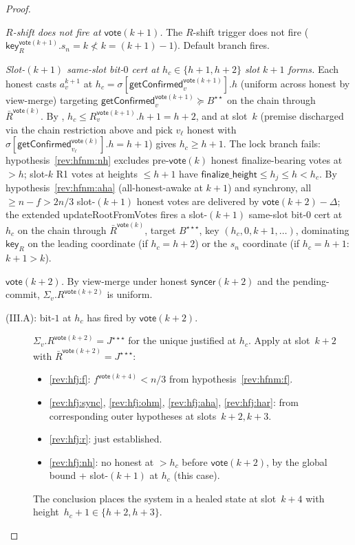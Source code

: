 \documentclass{article}
\newcommand{\finalizeHeight}{\mathsf{finalize\_height}}
\newcommand{\key}{\mathsf{key}}
\newcommand{\syncer}{\mathsf{syncer}}
\newcommand{\vote}{\mathsf{vote}}
\newcommand{\comm}[1]{\bar{#1}}
\newcommand{\updateRootFromVotes}{\textsf{updateRootFromVotes}\xspace}
\newcommand{\getConfirmed}{\textsf{getConfirmed}\xspace}
\theoremstyle{plain}
\theoremstyle{definition}
\theoremstyle{remark}
\newcommand{\AHA}{all-honest-awake\xspace}
\begin{document}
\begin{proof}
\begin{description}
\emph{$R$-shift does not fire at $\vote(k+1)$.}
The $R$-shift trigger does not fire ($\key_R^{\vote(k+1)}.s_n = k \not< k = (k+1) - 1$). Default branch fires.

\emph{Slot-$(k+1)$ same-slot bit-$0$ cert at $h_c \in \{h+1, h+2\}$ slot $k+1$ forms.}
Each honest casts $a^{k+1}_v$ at $h_c = \sigma[\getConfirmed_v^{\vote(k+1)}].h$ (uniform across honest by view-merge) targeting $\getConfirmed_v^{\vote(k+1)} \succeq B^{\star\star}$ on the chain through $\comm{R}^{\vote(k)}$. By , $h_c \leq R_v^{\vote(k+1)}.h + 1 = h+2$, and  at slot~$k$ (premise discharged via the chain restriction above and pick $v_\ell$ honest with $\sigma[\getConfirmed_{v_\ell}^{\vote(k)}].h = h+1$) gives $h_c \geq h+1$. The lock branch fails: hypothesis~\ref{rev:hfnm:nh} excludes pre-$\vote(k)$ honest finalize-bearing votes at $> h$; slot-$k$ R1 votes at heights $\leq h+1$ have $\finalizeHeight \leq h_j \leq h < h_c$. By hypothesis~\ref{rev:hfnm:aha} (\AHA at $k+1$) and synchrony, all $\geq n - f > 2n/3$ slot-$(k+1)$ honest votes are delivered by $\vote(k+2) - \Delta$; the extended \updateRootFromVotes{} fires a slot-$(k+1)$ same-slot bit-$0$ cert at $h_c$ on the chain through $\comm{R}^{\vote(k)}$, target $B^{\star\star\star}$, key $(h_c, 0, k+1, \ldots)$, dominating $\key_R$ on the leading coordinate (if $h_c = h+2$) or the $s_n$ coordinate (if $h_c = h+1$: $k+1 > k$).

\emph{$\vote(k+2)$.}
By view-merge under honest $\syncer(k+2)$ and the pending-commit, $\Sigma_v.R^{\vote(k+2)}$ is uniform.

\begin{description}
\item[{(III.A): bit-$1$ at $h_c$ has fired by $\vote(k+2)$.}]\hfill

$\Sigma_v.R^{\vote(k+2)} = J^{\star\star\star}$ for the unique justified at $h_c$. Apply  at slot~$k+2$ with $\comm{R}^{\vote(k+2)} = J^{\star\star\star}$:
\begin{itemize}
  \item \ref{rev:hfj:f}: $f^{\vote(k+4)} < n/3$ from hypothesis~\ref{rev:hfnm:f}.
  \item \ref{rev:hfj:sync}, \ref{rev:hfj:ohm}, \ref{rev:hfj:aha}, \ref{rev:hfj:har}: from corresponding outer hypotheses at slots~$k+2, k+3$.
  \item \ref{rev:hfj:r}: just established.
  \item \ref{rev:hfj:nh}: no honest at $> h_c$ before $\vote(k+2)$, by the global bound + slot-$(k+1)$ at $h_c$ (this case).
\end{itemize}
The conclusion places the system in a healed state at slot~$k+4$ with height~$h_c + 1 \in \{h+2, h+3\}$.


\end{description}
\end{description}
\end{proof}
\end{document}
